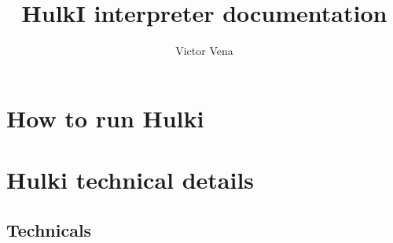\documentclass{article}
\title{HulkI interpreter documentation}
\author{Victor Vena}
\begin{document}
\maketitle

\section{How to run Hulki}
    
\section{Hulki technical details}
    \subsection{Technicals}
        
\end{document}
